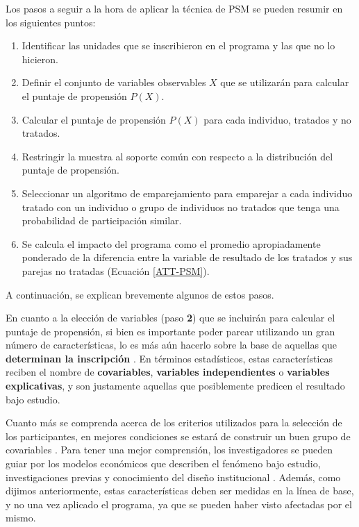 \documentclass[../../main.tex]{subfiles}
\begin{document}
Los pasos a seguir a la hora de aplicar la técnica de PSM se pueden resumir en los
siguientes puntos:
\begin{enumerate}[label=\textbf{\arabic*.}]
    \item Identificar las unidades que se inscribieron en el programa y las que no lo
    hicieron.
    \item Definir el conjunto de variables observables \(X\) que se utilizarán para
    calcular el puntaje de propensión \(P(X)\).
    \item Calcular el puntaje de propensión \(P(X)\) para cada individuo, tratados
    y no tratados.
    \item Restringir la muestra al soporte común con respecto a la distribución
    del puntaje de propensión.
    \item Seleccionar un algoritmo de emparejamiento para emparejar a cada individuo
    tratado con un individuo o grupo de individuos no tratados que tenga una probabilidad
    de participación similar.
    \item Se calcula el impacto del programa como el promedio apropiadamente
    ponderado de la diferencia entre la variable de resultado de los tratados y
    sus parejas no tratadas (Ecuación \ref{ATT-PSM}).
\end{enumerate}
A continuación, se explican brevemente algunos de estos pasos.

En cuanto a la elección de variables (paso \textbf{2}) que se incluirán para calcular el
puntaje de propensión, si bien es importante poder parear utilizando un gran número de
características, lo es más aún hacerlo sobre la base de aquellas que \textbf{determinan la
inscripción} \cite{gertler-2016}.  En términos estadísticos, estas características reciben
el nombre de \textbf{covariables}, \textbf{variables independientes} o \textbf{variables
explicativas}, y son justamente aquellas que posiblemente predicen el resultado bajo
estudio.

Cuanto más se comprenda acerca de los criterios utilizados para la selección de los
participantes, en mejores condiciones se estará de construir un buen grupo de covariables
\cite{gertler-2016}. Para tener una mejor comprensión, los investigadores se pueden guiar
por los modelos económicos que describen el fenómeno bajo estudio, investigaciones previas
y conocimiento del diseño institucional \cite{bernal}. Además, como dijimos anteriormente,
estas características deben ser medidas en la línea de base, y no una vez aplicado el
programa, ya que se pueden haber visto afectadas por el mismo.
\end{document}
